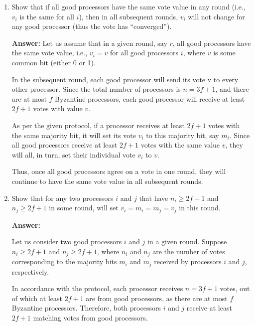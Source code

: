 \documentclass[11pt]{article}
\begin{document}
\begin{enumerate}
    \item Show that if all good processors have the same vote value in any round (i.e., $v_i $ is the same for all $i$), then in all subsequent rounds, $v_i$ will not change for any good processor (thus the vote has ``converged'').

    \textbf{Answer:}
    Let us assume that in a given round, say \(r\), all good processors have the same vote value, i.e., \(v_i = v\) for all good processors \(i\), where \(v\) is some common bit (either 0 or 1).

    In the subsequent round, each good processor will send its vote v to every other processor. Since the total number of processors is \(n = 3f + 1\), and there are at most \(f\) Byzantine processors, each good processor will receive at least \(2f + 1\) votes with value \(v\).

    As per the given protocol, if a processor receives at least \(2f + 1\) votes with the same majority bit, it will set its vote \(v_i\) to this majority bit, say \(m_i\). Since all good processors receive at least \(2f + 1\) votes with the same value \(v\), they will all, in turn, set their individual vote \(v_i\) to \(v\).

    Thus, once all good processors agree on a vote in one round, they will continue to have the same vote value in all subsequent rounds. %
    
    \item Show that for any two processors $i$ and $j$ that have $n_i \geq 2f+1$ and $n_j \geq 2f+1$ in some round, will
    set $v_i=m_i = m_j = v_j$ in this round. 

    \textbf{Answer:} 

    Let us consider two good processors \(i\) and \(j\) in a given round. Suppose \(n_i \geq 2f + 1\) and \(n_j \geq 2f + 1\), where \(n_i\) and \(n_j\) are the number of votes corresponding to the majority bits \(m_i\) and \(m_j\) received by processors \(i\) and \(j\), respectively.

    In accordance with the protocol, each processor receives \(n = 3f + 1\) votes, out of which at least \(2f + 1\) are from good processors, as there are at most \(f\) Byzantine processors. Therefore, both processors \(i\) and \(j\) receive at least \(2f + 1\) matching votes from good processors.


\end{enumerate}
\end{document}
